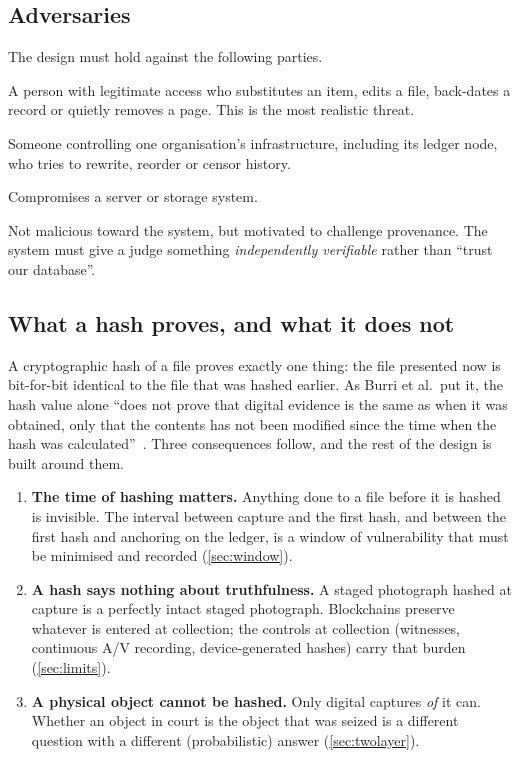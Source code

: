 \subsection{Adversaries}
The design must hold against the following parties.
\begin{description}[style=nextline,leftmargin=1.2em]
  \item[A1: Dishonest custodian (insider).] A person with legitimate access who substitutes an item, edits a file, back-dates a record or quietly removes a page. This is the most realistic threat.
  \item[A2: Dishonest agency administrator.] Someone controlling one organisation's infrastructure, including its ledger node, who tries to rewrite, reorder or censor history.
  \item[A3: External attacker.] Compromises a server or storage system.
  \item[A4: Opposing party in court.] Not malicious toward the system, but motivated to challenge provenance. The system must give a judge something \emph{independently verifiable} rather than \enquote{trust our database}.
\end{description}

\subsection{What a hash proves, and what it does not}
\label{sec:whathashproves}
A cryptographic hash of a file proves exactly one thing: the file presented now is bit-for-bit identical to the file that was hashed earlier. As Burri et al.\ put it, the hash value alone \enquote{does not prove that digital evidence is the same as when it was obtained, only that the contents has not been modified since the time when the hash was calculated}~\cite{burri2020}. Three consequences follow, and the rest of the design is built around them.
\begin{enumerate}
  \item \textbf{The time of hashing matters.} Anything done to a file before it is hashed is invisible. The interval between capture and the first hash, and between the first hash and anchoring on the ledger, is a window of vulnerability that must be minimised and recorded (\cref{sec:window}).
  \item \textbf{A hash says nothing about truthfulness.} A staged photograph hashed at capture is a perfectly intact staged photograph. Blockchains preserve whatever is entered at collection; the controls at collection (witnesses, continuous A/V recording, device-generated hashes) carry that burden (\cref{sec:limits}).
  \item \textbf{A physical object cannot be hashed.} Only digital captures \emph{of} it can. Whether an object in court is the object that was seized is a different question with a different (probabilistic) answer (\cref{sec:twolayer}).
\end{enumerate}

